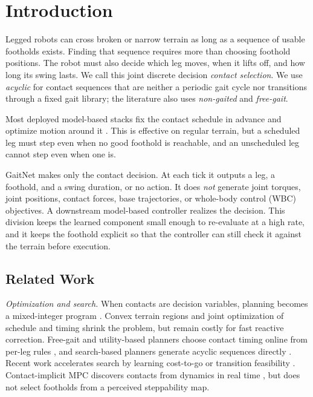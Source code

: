 \section{Introduction}
\label{sec:introduction}

Legged robots can cross broken or narrow terrain as long as a sequence
of usable footholds exists. Finding that sequence requires more than
choosing foothold positions. The robot must also decide which leg
moves, when it lifts off, and how long its swing lasts. We call this
joint discrete decision \textit{contact selection}. We use
\textit{acyclic} for contact sequences that are neither a periodic
gait cycle nor transitions through a fixed gait library; the
literature also uses \textit{non-gaited} and \textit{free-gait}.

Most deployed model-based stacks fix the contact schedule in advance
and optimize motion around it \cite{Kim2019highly-dynamic,
Wensing2022Nov, grandia_perceptive_2022}. This is effective on regular
terrain, but a scheduled leg must step even when no good foothold is
reachable, and an unscheduled leg cannot step even when one is.

GaitNet makes only the contact decision. At each tick it outputs a
leg, a foothold, and a swing duration, or no action. It does
\emph{not} generate joint torques, joint positions, contact forces,
base trajectories, or whole-body control (WBC) objectives. A
downstream model-based controller realizes the decision. This
division keeps the learned component small enough to re-evaluate at a
high rate, and it keeps the foothold explicit so that the controller
can still check it against the terrain before execution.

\subsection{Related Work}
\label{subsec:related-work}

\textit{Optimization and search.} When contacts are decision
variables, planning becomes a mixed-integer program
\cite{Geisert2019contact-planning}. Convex terrain regions
\cite{deits_footstep_2014} and joint optimization of schedule and
timing \cite{winkler_gait_2018, aceituno_simultaneous_2019} shrink the
problem, but remain costly for fast reactive correction. Free-gait and
utility-based planners choose contact timing online from per-leg rules
\cite{fankhauser_free_gait_2016, boussema_online_2019,
bjelonic_whole-body_2021}, and search-based planners generate acyclic
sequences directly \cite{amatucci_monte_2022}. Recent work accelerates
search by learning cost-to-go \cite{taouil_non-gaited_2024} or
transition feasibility \cite{akizhanov_learning_2024}.
Contact-implicit MPC discovers contacts from dynamics in real time
\cite{kim_contact-implicit_2025}, but does not select footholds from a
perceived steppability map.

